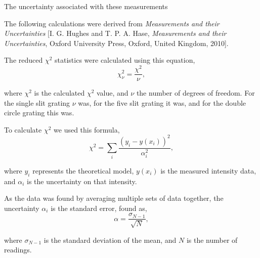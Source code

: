 \documentclass[twocolumn]{revtex4}
\begin{document}
The uncertainty associated with these measurements 

The following calculations were derived from \textit{Measurements and their Uncertainties} [I. G. Hughes and T. P. A. Hase, \textit{Measurements and their Uncertainties}, Oxford University Press, Oxford, United Kingdom, 2010].

The reduced $\chi^2$ statistics were calculated using this equation,
\begin{equation}
\chi^2_\nu = \frac{\chi^2}{\nu},
\end{equation}

where $\chi^2$ is the calculated $\chi^2$ value, and $\nu$ the number of degrees of freedom. For the single slit grating $\nu$ was, for the five slit grating it was, and for the double circle grating this was.

To calculate $\chi^2$ we used this formula,
\begin{equation}
\chi^2 = \sum_i \frac{(y_i -y(x_i))^2}{\alpha_i^2},
\end{equation}

where $y_i$ represents the theoretical model, $y(x_i)$ is the measured intensity data, and $\alpha_i$ is the uncertainty on that intensity.

As the data was found by averaging multiple sets of data together, the uncertainty $\alpha_i$ is the standard error, found as,
\begin{equation}
\alpha=\frac{\sigma_{N-1}}{\sqrt{N}},
\end{equation}

where $\sigma_{N-1}$ is the standard deviation of the mean, and $N$ is the number of readings.

\clearpage
\end{document}
